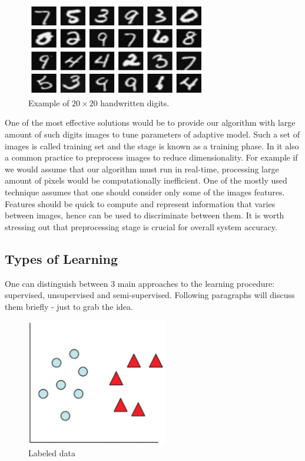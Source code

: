 \documentclass{mini}
\begin{document}
\begin{figure}
  \begin{center}
    \includegraphics[width=0.7\textwidth]{images/handwritten_digits_example.png}
  \end{center}
  \caption{Example of $20 \times 20$ handwritten digits.}
  \label{fig:handwritten_ex}
\end{figure}

One of the most effective solutions would be to provide our algorithm with large amount of such digits images to tune parameters of adaptive model. Such a set of images is called training set and the stage is known as a training phase. In it also a common practice to preprocess images to reduce dimensionality. For example if we would assume that our algorithm must run in real-time, processing large amount of pixels would be computationally inefficient. One of the mostly used technique assumes that one should consider only some of the images features. Features should be quick to compute and represent information that varies between images, hence can be used to discriminate between them. It is worth stressing out that preprocessing stage is crucial for overall system accuracy.


\subsection{Types of Learning}
One can distinguish between 3 main approaches to the learning procedure: supervised, unsupervised and semi-supervised. Following paragraphs will discuss them briefly - just to grab the idea.

\begin{figure}
  \begin{center}
    \includegraphics[width=0.55\textwidth]{images/supervised_graph.png}
  \end{center}
  \caption{Labeled data}
  \label{fig:handwritten_ex}
\end{figure}
\end{document}
